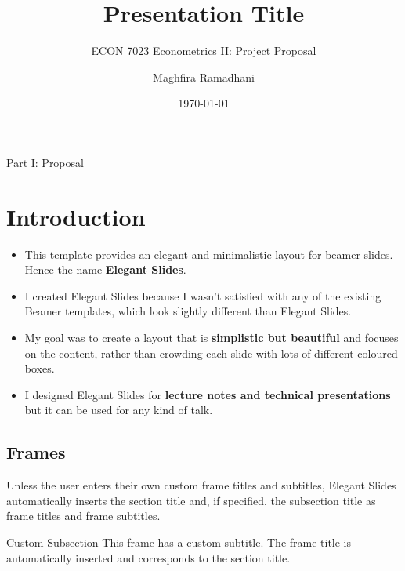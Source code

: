 \documentclass[
11pt,notheorems,hyperref={pdfauthor=whatever}
]{beamer}
\title[
]{Presentation Title}
\subtitle{ECON 7023 Econometrics II: Project Proposal}
\author[
]{
    Maghfira Ramadhani 
}
\institute{
    School of Economics, \\
    Georgia Institute of Technology}
\date{\today}
\begin{document}
{
\begin{frame}
  \titlepage
\end{frame}
}
\addtocounter{framenumber}{-1}

\begin{frame}{Part I: Proposal}
    \tableofcontents[part=1]
\end{frame}


\section{Introduction}
\begin{frame}
\begin{itemize}
    \item This template provides an  elegant and minimalistic layout for beamer slides. Hence the name \alert{\textbf{Elegant Slides}}.
    \item I created Elegant Slides because I wasn't satisfied with any of the existing Beamer templates, which look slightly different than Elegant Slides.
    \item My goal was to create a layout that is \alert{\textbf{simplistic but beautiful}} and focuses on the content, rather than crowding each slide with lots of different coloured boxes.
    \item I designed Elegant Slides for \alert{\textbf{lecture notes and technical presentations}} but it can be used for any kind of talk. 
\end{itemize}
     
\end{frame}

\subsection{Frames}
\begin{frame}
    Unless the user enters their own custom frame titles and subtitles, Elegant Slides automatically inserts the section title and, if specified, the subsection title as frame titles and frame subtitles.
\end{frame}

\begin{frame}{}{Custom Subsection}
    This frame has a custom subtitle. The frame title is automatically inserted and corresponds to the section title.
\end{frame}
\end{document}
